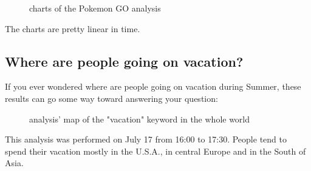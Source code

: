 \documentclass[a4paper,11pt]{report}
\begin{document}
\begin{figure}[H]
\vspace{-5pt}
\begin{center}
\vspace{-20pt}
\caption{charts of the Pokemon GO analysis}
\end{center}
\end{figure}
\vspace{-10pt}

The charts are pretty linear in time.

\subsection{Where are people going on vacation?}
If you ever wondered where are people going on vacation during Summer, these results can go some way toward answering your question:
\begin{figure}[H]
\vspace{-5pt}
\begin{center}
\vspace{-20pt}
\caption{analysis' map of the "vacation" keyword in the whole world}
\end{center}
\end{figure}
\vspace{-10pt}
This analysis was performed on July 17 from 16:00 to 17:30. People tend to spend their vacation mostly in the U.S.A., in central Europe and in the South of Asia.
\end{document}
